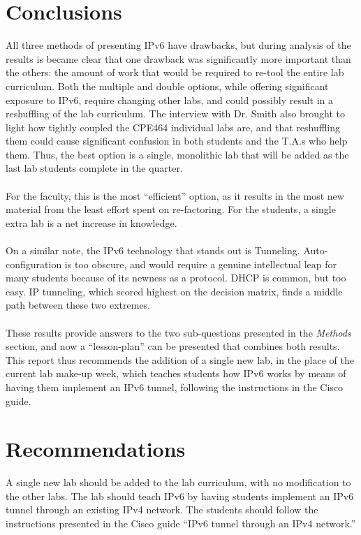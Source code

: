 \documentclass[12pt]{article}
\begin{document}
\section{Conclusions}
All three methods of presenting IPv6 have drawbacks, but during analysis of the results is became clear that one drawback was significantly more important than the others: the amount of work that would be required to re-tool the entire lab curriculum. Both the multiple and double options, while offering significant exposure to IPv6, require changing other labs, and could possibly result in a reshuffling of the lab curriculum. The interview with Dr. Smith also brought to light how tightly coupled the CPE464 individual labs are, and that reshuffling them could cause significant confusion in both students and the T.A.s who help them. Thus, the best option is a single, monolithic lab that will be added as the last lab students complete in the quarter.\\\\
For the faculty, this is the most ``efficient'' option, as it results in the most new material from the least effort spent on re-factoring. For the students, a single extra lab is a net increase in knowledge.\\\\
On a similar note, the IPv6 technology that stands out is Tunneling. Auto-configuration is too obscure, and would require a genuine intellectual leap for many students because of its newness as a protocol. DHCP is common, but too easy. IP tunneling, which scored highest on the decision matrix, finds a middle path between these two extremes.\\\\
These results provide answers to the two sub-questions presented in the \textit{Methods} section, and now a ``lesson-plan'' can be presented that combines both results. This report thus recommends the addition of a single new lab, in the place of the current lab make-up week, which teaches students how IPv6 works by means of having them implement an IPv6 tunnel, following the instructions in the Cisco guide.

\section{Recommendations}
A single new lab should be added to the lab curriculum, with no modification to the other labs. The lab should teach IPv6 by having students implement an IPv6 tunnel through an existing IPv4 network. The students should follow the instructions presented in the Cisco guide ``IPv6 tunnel through an IPv4 network.''
\end{document}

